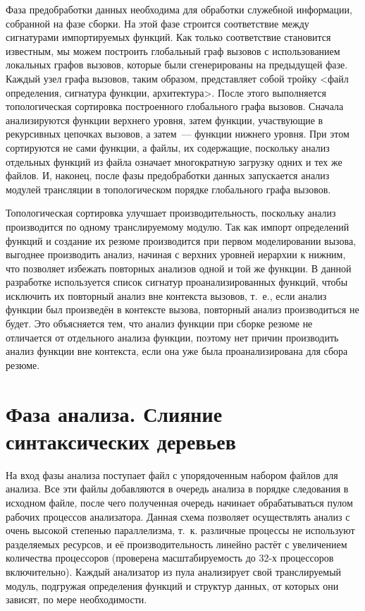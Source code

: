 Фаза предобработки данных необходима для обработки служебной информации, собранной на фазе сборки. На этой фазе строится соответствие между сигнатурами импортируемых функций. Как только соответствие становится известным, мы можем построить глобальный граф вызовов с использованием локальных графов вызовов, которые были сгенерированы на предыдущей фазе. Каждый узел графа вызовов, таким образом, представляет собой тройку <файл определения, сигнатура функции, архитектура>. После этого выполняется топологическая сортировка построенного глобального графа вызовов. Сначала анализируются функции верхнего уровня, затем функции, участвующие в рекурсивных цепочках вызовов, а затем~--- функции нижнего уровня. При этом сортируются не сами функции, а файлы, их содержащие, поскольку анализ отдельных функций из файла означает многократную загрузку одних и тех же файлов. И, наконец, после фазы предобработки данных запускается анализ модулей трансляции в топологическом порядке глобального графа вызовов.

Топологическая сортировка улучшает производительность, поскольку анализ производится по одному транслируемому модулю. Так как импорт определений функций и создание их резюме производится при первом моделировании вызова, выгоднее производить анализ, начиная с верхних уровней иерархии к нижним, что позволяет избежать повторных анализов одной и той же функции. В данной разработке используется список сигнатур проанализированных функций, чтобы исключить их повторный анализ вне контекста вызовов, т.~е., если анализ функции был произведён в контексте вызова, повторный анализ производиться не будет. Это объясняется тем, что анализ функции при сборке резюме не отличается от отдельного анализа функции, поэтому нет причин производить анализ функции вне контекста, если она уже была проанализирована для сбора резюме.

\section{Фаза анализа. Слияние синтаксических деревьев}

На вход фазы анализа поступает файл с упорядоченным набором файлов для анализа. Все эти файлы добавляются в очередь анализа в порядке следования в исходном файле, после чего полученная очередь начинает обрабатываться пулом рабочих процессов анализатора. Данная схема позволяет осуществлять анализ с очень высокой степенью параллелизма, т.~к. различные процессы не используют разделяемых ресурсов, и её производительность линейно растёт с увеличением количества процессоров (проверена масштабируемость до 32-х процессоров включительно). Каждый анализатор из пула анализирует свой транслируемый модуль, подгружая определения функций и структур данных, от которых они зависят, по мере необходимости.


